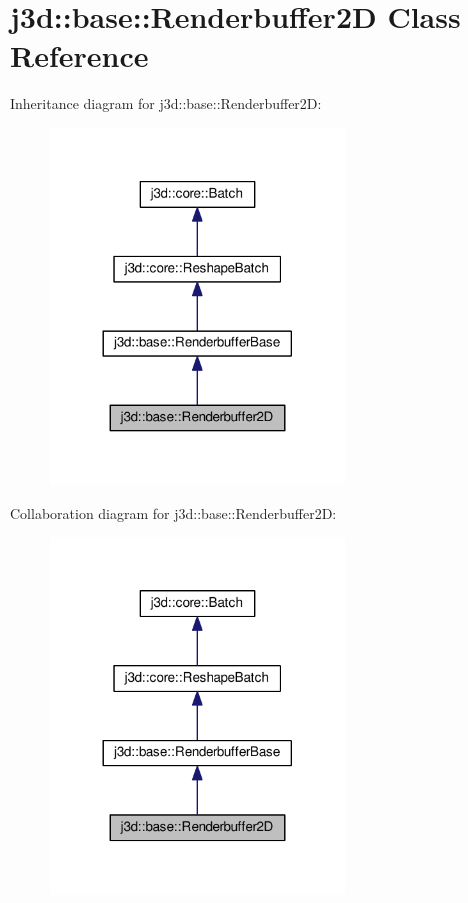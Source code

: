 \hypertarget{classj3d_1_1base_1_1Renderbuffer2D}{}\section{j3d\+:\+:base\+:\+:Renderbuffer2\+D Class Reference}
\label{classj3d_1_1base_1_1Renderbuffer2D}


Inheritance diagram for j3d\+:\+:base\+:\+:Renderbuffer2\+D\+:
\nopagebreak
\begin{figure}[H]
\begin{center}
\leavevmode
\includegraphics[width=221pt]{classj3d_1_1base_1_1Renderbuffer2D__inherit__graph}
\end{center}
\end{figure}


Collaboration diagram for j3d\+:\+:base\+:\+:Renderbuffer2\+D\+:
\nopagebreak
\begin{figure}[H]
\begin{center}
\leavevmode
\includegraphics[width=221pt]{classj3d_1_1base_1_1Renderbuffer2D__coll__graph}
\end{center}
\end{figure}

